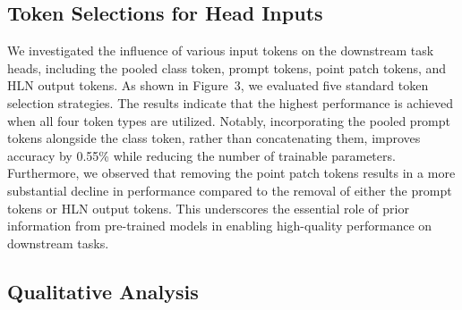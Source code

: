 \subsection{Token Selections for Head Inputs}  
We investigated the influence of various input tokens on the downstream task heads, including the pooled class token, prompt tokens, point patch tokens, and HLN output tokens. As shown in Figure~3, we evaluated five standard token selection strategies. The results indicate that the highest performance is achieved when all four token types are utilized. Notably, incorporating the pooled prompt tokens alongside the class token, rather than concatenating them, improves accuracy by 0.55\% while reducing the number of trainable parameters. Furthermore, we observed that removing the point patch tokens results in a more substantial decline in performance compared to the removal of either the prompt tokens or HLN output tokens. This underscores the essential role of prior information from pre-trained models in enabling high-quality performance on downstream tasks.


\subsection{Qualitative Analysis}




